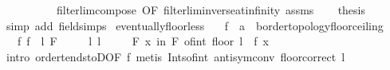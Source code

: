 \begin{isabellebody}
\ \ \ \ \ \ \ \ \ \ filterlim{\isacharunderscore}{\kern0pt}compose\ {\isacharbrackleft}{\kern0pt}OF\ filterlim{\isacharunderscore}{\kern0pt}inverse{\isacharunderscore}{\kern0pt}at{\isacharunderscore}{\kern0pt}infinity\ assms{\isacharparenleft}{\kern0pt}{}{\isacharparenright}{\kern0pt}{\isacharbrackright}{\kern0pt}{\isacharparenright}{\kern0pt}\isanewline
\ \ \isamarkupfalse%
\ {\isacharquery}{\kern0pt}thesis\ \isamarkupfalse%
\ {\isacharparenleft}{\kern0pt}simp\ add{\isacharcolon}{\kern0pt}\ field{\isacharunderscore}{\kern0pt}simps{\isacharparenright}{\kern0pt}\isanewline
{}\isamarkupfalse%
%
\endisatagproof
{\isafoldproof}%
%
\isadelimproof
%
\endisadelimproof
%
\isadelimdocument
%
\endisadelimdocument
%
\isatagdocument
%
\isamarkuptrue%
%
\endisatagdocument
{\isafolddocument}%
%
\isadelimdocument
%
\endisadelimdocument
{}\isamarkupfalse%
\ eventually{\isacharunderscore}{\kern0pt}floor{\isacharunderscore}{\kern0pt}less{\isacharcolon}{\kern0pt}\isanewline
\ \ \ f\ {\isacharcolon}{\kern0pt}{\isacharcolon}{\kern0pt}\ {\isachardoublequoteopen}{\isacharprime}{\kern0pt}a\ {\isasymRightarrow}\ {\isacharprime}{\kern0pt}b{\isacharcolon}{\kern0pt}{\isacharcolon}{\kern0pt}{\isacharbraceleft}{\kern0pt}order{\isacharunderscore}{\kern0pt}topology{\isacharcomma}{\kern0pt}floor{\isacharunderscore}{\kern0pt}ceiling{\isacharbraceright}{\kern0pt}{\isachardoublequoteclose}\isanewline
\ \ \ f{\isacharcolon}{\kern0pt}\ {\isachardoublequoteopen}{\isacharparenleft}{\kern0pt}f\ {\isasymlonglongrightarrow}\ l{\isacharparenright}{\kern0pt}\ F{\isachardoublequoteclose}\isanewline
\ \ \ \ \ l{\isacharcolon}{\kern0pt}\ {\isachardoublequoteopen}l\ {\isasymnotin}\ {\isasymint}{\isachardoublequoteclose}\isanewline
\ \ \ {\isachardoublequoteopen}{\isasymforall}\isactrlsub F\ x\ in\ F{\isachardot}{\kern0pt}\ of{\isacharunderscore}{\kern0pt}int\ {\isacharparenleft}{\kern0pt}floor\ l{\isacharparenright}{\kern0pt}\ {\isacharless}{\kern0pt}\ f\ x{\isachardoublequoteclose}\isanewline
%
\isadelimproof
\ \ %
\endisadelimproof
%
\isatagproof
{}\isamarkupfalse%
\ {\isacharparenleft}{\kern0pt}intro\ order{\isacharunderscore}{\kern0pt}tendstoD{\isacharbrackleft}{\kern0pt}OF\ f{\isacharbrackright}{\kern0pt}{\isacharparenright}{\kern0pt}\ {\isacharparenleft}{\kern0pt}metis\ Ints{\isacharunderscore}{\kern0pt}of{\isacharunderscore}{\kern0pt}int\ antisym{\isacharunderscore}{\kern0pt}conv{}\ floor{\isacharunderscore}{\kern0pt}correct\ l{\isacharparenright}{\kern0pt}%

\end{isabellebody}
